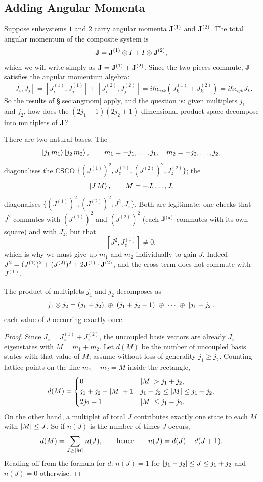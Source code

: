 \documentclass[a4paper]{scrartcl}
\begin{document}
\subsection{Adding Angular Momenta}

Suppose subsystems $1$ and $2$ carry angular momenta $\mathbf{J}^{(1)}$ and $\mathbf{J}^{(2)}$. The total angular momentum of the composite system is
$$
\mathbf{J} = \mathbf{J}^{(1)}\otimes I + I \otimes \mathbf{J}^{(2)},
$$
which we will write simply as $\mathbf{J} = \mathbf{J}^{(1)} + \mathbf{J}^{(2)}$. Since the two pieces commute, $\mathbf{J}$ satisfies the angular momentum algebra:
$$
[J_i, J_j] = [J_i^{(1)},J_j^{(1)}] + [J_i^{(2)},J_j^{(2)}] = i\hbar\epsilon_{ijk}\left( J_k^{(1)} + J_k^{(2)} \right) = i\hbar\epsilon_{ijk}J_k.
$$
So the results of \S\ref{sec:angmom} apply, and the question is: given multiplets $j_1$ and $j_2$, how does the $(2j_1+1)(2j_2+1)$-dimensional product space decompose into multiplets of $\mathbf{J}$?

There are two natural bases. The 
$$
\ket{j_1 \, m_1}\ket{j_2\,m_2}, \qquad m_1 = -j_1,\dots,j_1, \quad m_2 = -j_2,\dots,j_2,
$$
diagonalises the CSCO $\{(J^{(1)})^2, J_z^{(1)}, (J^{(2)})^2, J_z^{(2)}\}$; the 
$$
\ket{J\,M}, \qquad M = -J, \dots, J,
$$
diagonalises $\{(J^{(1)})^2, (J^{(2)})^2, J^2, J_z\}$. Both are legitimate: one checks that $J^2$ commutes with $(J^{(1)})^2$ and $(J^{(2)})^2$ (each $\mathbf{J}^{(a)}$ commutes with its own square) and with $J_z$, but that
$$
[J^2, J_z^{(1)}] \neq 0,
$$
which is why we must give up $m_1$ and $m_2$ individually to gain $J$. Indeed $J^2 = (J^{(1)})^2 + (J^{(2)})^2 + 2\mathbf{J}^{(1)}\cdot\mathbf{J}^{(2)}$, and the cross term does not commute with $J_z^{(1)}$.

\begin{theorem}
    The product of multiplets $j_1$ and $j_2$ decomposes as
    $$
    j_1 \otimes j_2 = (j_1+j_2)\;\oplus\;(j_1+j_2-1)\;\oplus\;\cdots\;\oplus\;\lvert j_1-j_2\rvert,
    $$
    each value of $J$ occurring exactly once.
\end{theorem}
\begin{proof}
    Since $J_z = J_z^{(1)}+J_z^{(2)}$, the uncoupled basis vectors are already $J_z$ eigenstates with $M = m_1+m_2$. Let $d(M)$ be the number of uncoupled basis states with that value of $M$; assume without loss of generality $j_1\geq j_2$. Counting lattice points on the line $m_1+m_2 = M$ inside the rectangle,
    $$
    d(M) = \begin{cases}
    0 & \lvert M\rvert > j_1+j_2,\\
    j_1+j_2-\lvert M\rvert+1 & j_1 - j_2 \leq \lvert M\rvert \leq j_1+j_2,\\
    2j_2+1 & \lvert M\rvert \leq j_1 - j_2.
    \end{cases}
    $$
    On the other hand, a multiplet of total $J$ contributes exactly one state to each $M$ with $\lvert M\rvert\leq J$. So if $n(J)$ is the number of times $J$ occurs,
    $$
    d(M) = \sum_{J \geq \lvert M\rvert} n(J), \qquad \text{hence} \qquad n(J) = d(J) - d(J+1).
    $$
    Reading off from the formula for $d$: $n(J) = 1$ for $\lvert j_1-j_2\rvert\leq J \leq j_1+j_2$ and $n(J) = 0$ otherwise.
\end{proof}
\end{document}
